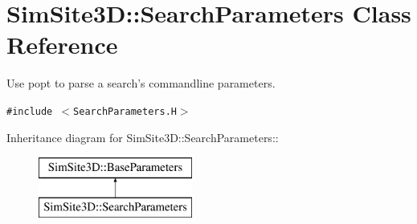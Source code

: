 \section{SimSite3D::Search\-Parameters Class Reference}
\label{classSimSite3D_1_1SearchParameters}
Use popt to parse a search's commandline parameters.  


{\tt \#include $<$Search\-Parameters.H$>$}

Inheritance diagram for SimSite3D::Search\-Parameters::\begin{figure}[H]
\begin{center}
\leavevmode
\includegraphics[height=2cm]{classSimSite3D_1_1SearchParameters}
\end{center}
\end{figure}
